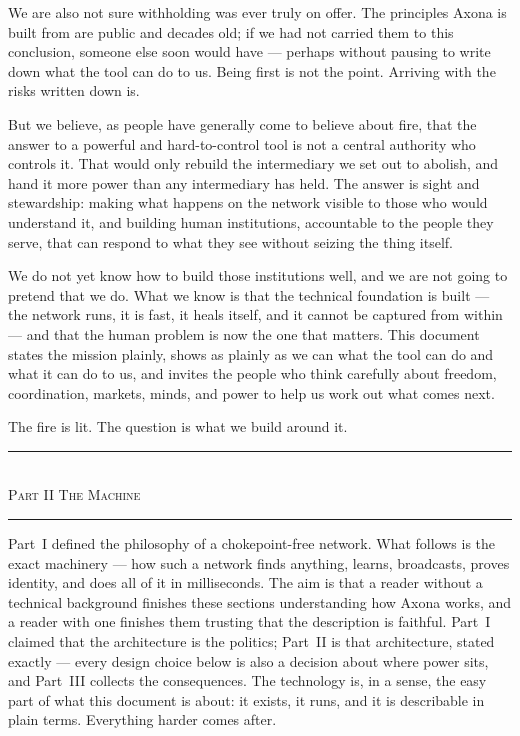 \documentclass[nobib,justified]{tufte-handout}
\newcommand{\manpart}[1]{%
  \needspace{8\baselineskip}%
  \begin{center}%
  \vspace{1.2em}%
  {\color{rust}\rule{3em}{0.8pt}}\\[0.7em]%
  {\scshape\large #1}\\[0.4em]%
  {\color{rust}\rule{3em}{0.8pt}}%
  \vspace{0.9em}%
  \end{center}}
\begin{document}
We are also not sure withholding was ever truly on offer. The principles Axona
is built from are public and decades old; if we had not carried them to this
conclusion, someone else soon would have --- perhaps without pausing to write
down what the tool can do to us. Being first is not the point. Arriving with the risks written down is.

But we believe, as people have generally come to believe about fire, that the
answer to a powerful and hard-to-control tool is not a central authority who
controls it. That would only rebuild the intermediary we set out to abolish,
and hand it more power than any intermediary has held. The answer is sight and
stewardship: making what happens on the network visible to those who would
understand it, and building human institutions, accountable to the people they
serve, that can respond to what they see without seizing the thing itself.

We do not yet know how to build those institutions well, and we are not going
to pretend that we do. What we know is that the technical foundation is built
--- the network runs, it is fast, it heals itself, and it cannot be captured
from within --- and that the human problem is now the one that matters. This
document states the mission plainly, shows as plainly as we can what the tool can do and what it can do to us, and invites the people who think carefully
about freedom, coordination, markets, minds, and power to help us work out what
comes next.

The fire is lit. The question is what we build around it.

\newpage
\manpart{Part II \;\textbullet\; The Machine}

\noindent Part~I defined the philosophy of a chokepoint-free network. What follows is the exact machinery --- how such a network finds anything, learns, broadcasts, proves identity, and does all of it in milliseconds. The aim is that a reader without a technical background finishes these sections understanding how Axona works, and a reader with one finishes them trusting that the description is faithful. Part~I claimed that the architecture is the politics; Part~II is that architecture, stated exactly --- every design choice below is also a decision about where power sits, and Part~III collects the consequences. The technology is, in a sense, the easy part of what this document is about: it exists, it runs, and it is describable in plain terms. Everything harder comes after.


\end{document}
